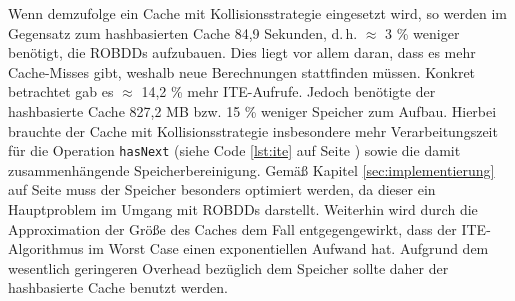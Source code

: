 Wenn demzufolge ein Cache mit Kollisionsstrategie eingesetzt wird, so werden im Gegensatz zum hashbasierten Cache 84,9 Sekunden, d.\,h. $\approx$ 3 \% weniger benötigt, die ROBDDs aufzubauen. Dies liegt vor allem daran, dass es mehr Cache-Misses gibt, weshalb neue Berechnungen stattfinden müssen. Konkret betrachtet gab es $\approx$ 14,2 \% mehr ITE-Aufrufe. Jedoch benötigte der hashbasierte Cache 827,2 MB bzw. 15 \% weniger Speicher zum Aufbau. Hierbei brauchte der Cache mit Kollisionsstrategie insbesondere mehr Verarbeitungszeit für die Operation \texttt{hasNext} (siehe Code \ref{lst:ite} auf Seite \pageref{lst:ite}) sowie die damit zusammenhängende Speicherbereinigung. Gemäß Kapitel \ref{sec:implementierung} auf Seite \pageref{sec:implementierung} muss der Speicher besonders optimiert werden, da dieser ein Hauptproblem im Umgang mit ROBDDs darstellt. Weiterhin wird durch die Approximation der Größe des Caches dem Fall entgegengewirkt, dass der ITE-Algorithmus im Worst Case einen exponentiellen Aufwand hat. Aufgrund dem wesentlich geringeren Overhead bezüglich dem Speicher sollte daher der hashbasierte Cache benutzt werden.

